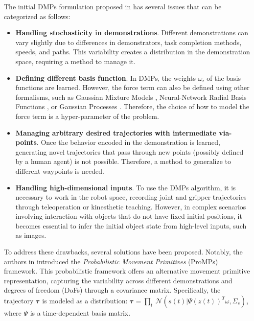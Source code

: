The initial DMPs formulation proposed in \cite{ijspeert2002learning} has several issues that can be categorized as follows:
\begin{itemize}
    \item \textbf{Handling stochasticity in demonstrations}. Different demonstrations can vary slightly due to differences in demonstrators, task completion methods, speeds, and paths. This variability creates a distribution in the demonstration space, requiring a method to manage it.
    
    \item \textbf{Defining different basis function}. In DMPs, the weights $\omega_{i}$ of the basis functions are learned. However, the force term can also be defined using other formalisms, such as Gaussian Mixture Models \cite{si2023composite}, Neural-Network Radial Basis Functions \cite{li2023human}, or Gaussian Processes \cite{fanger2016gaussian}. Therefore, the choice of how to model the force term is a hyper-parameter of the problem.

    \item \textbf{Managing arbitrary desired trajectories with intermediate via-points}. Once the behavior encoded in the demonstration is learned, generating novel trajectories that pass through new points (possibly defined by a human agent) is not possible. Therefore, a method to generalize to different waypoints is needed.
    
    \item \textbf{Handling high-dimensional inputs}. To use the DMPs algorithm, it is necessary to work in the robot space, recording joint and gripper trajectories through teleoperation or kinesthetic teaching. However, in complex scenarios involving interaction with objects that do not have fixed initial positions, it becomes essential to infer the initial object state from high-level inputs, such as images.
\end{itemize}
To address these drawbacks, several solutions have been proposed. Notably, the authors in \cite{paraschos2013ProMPs} introduced the \textit{Probabilistic Movement Primitives} (ProMPs) framework. This probabilistic framework offers an alternative movement primitive representation, capturing the variability across different demonstrations and degrees of freedom (DoFs) through a covariance matrix. Specifically, the trajectory $\mathbf{\tau}$ is modeled as a distribution: $\boldsymbol{\tau} = \underset{t}{\prod} \ \mathcal{N}(s(t)|\Psi(z(t))^{T}\omega, \Sigma_{s})$, where $\Psi$ is a time-dependent basis matrix.

